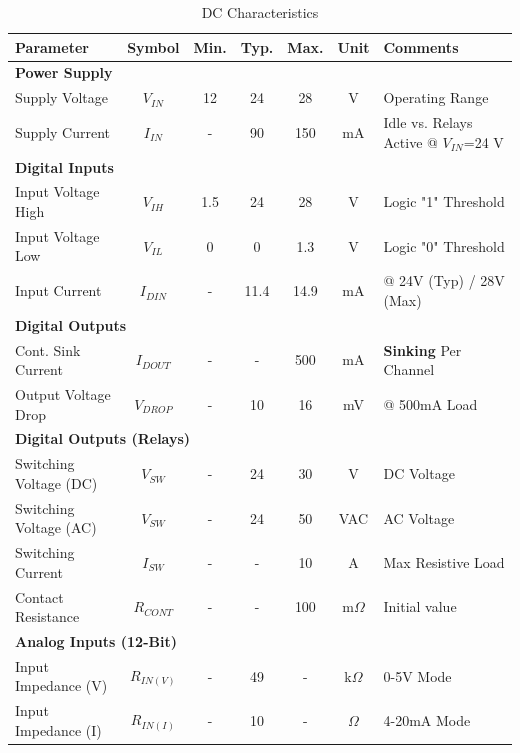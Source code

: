 \documentclass[10pt]{datasheet}
\begin{document}
\begin{table}[h]
\begin{threeparttable}
\caption{DC Characteristics}
\begin{tabularx}{\textwidth}{l | c | c c c | c | X}
    \thickhline
    \textbf{Parameter} & \textbf{Symbol} & \textbf{Min.} & \textbf{Typ.} & \textbf{Max.} & \textbf{Unit} & \textbf{Comments} \\
    \hline
    \multicolumn{7}{l}{\textbf{Power Supply}} \\
    \hline
    Supply Voltage      & $V_{IN}$   & 12  & 24  & 28  & V  & Operating Range \\
    Supply Current      & $I_{IN}$   & -   & 90  & 150 & mA & Idle vs. Relays Active @ $V_{IN}$=24 V \\
    \hline
    \multicolumn{7}{l}{\textbf{Digital Inputs}} \\
    \hline
    Input Voltage High  & $V_{IH}$   & 1.5  & 24  & 28  & V  & Logic "1" Threshold \\
    Input Voltage Low   & $V_{IL}$   & 0  & 0   & 1.3  & V  & Logic "0" Threshold \\
    Input Current       & $I_{DIN}$  & -   & 11.4   & 14.9  & mA & @ 24V (Typ) / 28V (Max) \\
    \hline
    \multicolumn{7}{l}{\textbf{Digital Outputs}} \\
    \hline
    Cont. Sink Current  & $I_{DOUT}$ & -   & -   & 500 & mA & \textbf{Sinking} Per Channel \\
    Output Voltage Drop & $V_{DROP}$ & -   & 10 & 16 & mV  & @ 500mA Load \\
    \hline
    \multicolumn{7}{l}{\textbf{Digital Outputs (Relays)}} \\
    \hline
    Switching Voltage (DC)   & $V_{SW}$   & -   & 24  & 30 & V  & DC Voltage  \\
    Switching Voltage (AC)   & $V_{SW}$   & -   & 24  & 50 & VAC  & AC Voltage  \\
    Switching Current   & $I_{SW}$   & -   & -   & 10  & A  & Max Resistive Load \\
    Contact Resistance  & $R_{CONT}$ & -   & - & 100   & m$\Omega$ & Initial value \\
    \hline
    \multicolumn{7}{l}{\textbf{Analog Inputs (12-Bit)}} \\
    \hline
    Input Impedance (V) & $R_{IN(V)}$& - & 49   & -   & k$\Omega$ & 0-5V Mode \\
    Input Impedance (I) & $R_{IN(I)}$& -   & 10 & -   & $\Omega$ & 4-20mA Mode \\

\end{tabularx}
\end{threeparttable}
\end{table}
\end{document}
